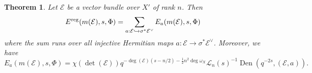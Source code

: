 \documentclass[reqno]{amsart}
\numberwithin{equation}{section}
\newcommand{\CHerm}{\mathscr{H}\!\mathrm{erm}}
\newcommand{\sL}{\ensuremath{\mathscr{L}}\xspace}
\newcommand{\inj}{\hookrightarrow}
\DeclareMathOperator{\Den}{Den}
\newcommand{\Yundel}[1]{{\color{green} Delete: {#1}}}
\newcommand{\incl}{\hookrightarrow}
\newcommand{\s}{\sigma}
\newcommand\cE{\mathcal{E}}
\newtheorem{thm}{Theorem}[section]
\theoremstyle{remark}
\numberwithin{equation}{section}
\begin{document}
\begin{thm}\label{th:Eis Den} 
Let $\cE$ be a vector bundle over $X'$ of rank $n$.  
Then 
\begin{equation}\label{eq:reg}
E^{\rm reg}(m(\cE),s,\Phi)=\sum_{a: \cE\inj \s^{*}\cE^\vee}E_{a}(m(\cE), s,\Phi)
\end{equation}
where the sum runs over all injective Hermitian maps  $a: \cE\to \s^{*}\cE^\vee $. Moreover, we have
\begin{equation}\label{Ea Den}
E_{a}(m(\cE),s,\Phi)=\chi(\det(\cE))q^{-\deg(\cE)( s-n/2)-\frac{1}{2}n^2\deg\omega_X }\sL_n(s) ^{-1} \Den(q^{-2s}, (\cE,a)).
\end{equation}
\end{thm}
\end{document}
